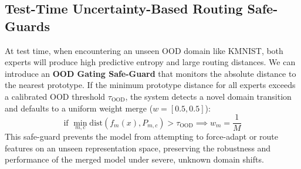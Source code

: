 \documentclass{article}
\theoremstyle{plain}
\theoremstyle{definition}
\theoremstyle{remark}
\begin{document}
\subsection{Test-Time Uncertainty-Based Routing Safe-Guards}
At test time, when encountering an unseen OOD domain like KMNIST, both experts will produce high predictive entropy and large routing distances. We can introduce an \textbf{OOD Gating Safe-Guard} that monitors the absolute distance to the nearest prototype. If the minimum prototype distance for all experts exceeds a calibrated OOD threshold $\tau_{\text{OOD}}$, the system detects a novel domain transition and defaults to a uniform weight merge ($w = [0.5, 0.5]$):
\begin{equation}
    \text{if } \min_{m, c} \text{dist}(f_m(x), P_{m, c}) > \tau_{\text{OOD}} \implies w_m = \frac{1}{M}
\end{equation}
This safe-guard prevents the model from attempting to force-adapt or route features on an unseen representation space, preserving the robustness and performance of the merged model under severe, unknown domain shifts.
\end{document}
